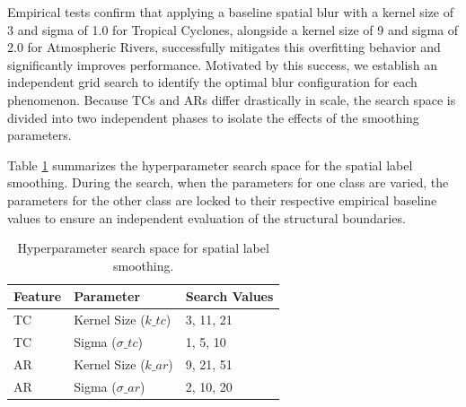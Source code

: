 Empirical tests confirm that applying a baseline spatial blur with a kernel size of 3 and sigma of 1.0 for Tropical Cyclones, alongside a kernel size of 9 and sigma of 2.0 for Atmospheric Rivers, successfully mitigates this overfitting behavior and significantly improves performance. Motivated by this success, we establish an independent grid search to identify the optimal blur configuration for each phenomenon. Because TCs and ARs differ drastically in scale, the search space is divided into two independent phases to isolate the effects of the smoothing parameters.

Table \ref{tab:smooth_search} summarizes the hyperparameter search space for the spatial label smoothing. During the search, when the parameters for one class are varied, the parameters for the other class are locked to their respective empirical baseline values to ensure an independent evaluation of the structural boundaries.

\begin{table}[h]
\centering
\begin{tabular}{lll}
Feature & Parameter & Search Values \\
\hline
TC & Kernel Size ($k\_{tc}$) & 3, 11, 21 \\
TC & Sigma ($\sigma\_{tc}$) & 1, 5, 10 \\
AR & Kernel Size ($k\_{ar}$) & 9, 21, 51 \\
AR & Sigma ($\sigma\_{ar}$) & 2, 10, 20 \\
\hline
\end{tabular}
\caption{Hyperparameter search space for spatial label smoothing.}
\label{tab:smooth_search}
\end{table}